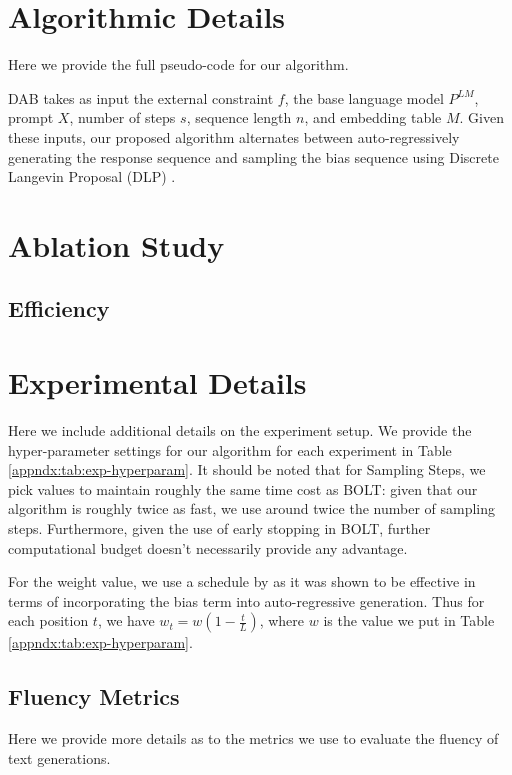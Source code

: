 \section{Algorithmic Details} \label{appndx:algrthm-details}
Here we provide the full pseudo-code for our algorithm. 


DAB takes as input the external constraint $f$, the base language model $P^{LM}$, prompt $X$, number of steps $s$, sequence length $n$, and embedding table $M$. Given these inputs, our proposed algorithm alternates between auto-regressively generating the response sequence and sampling the bias sequence using Discrete Langevin Proposal (DLP) \citep{zhang2022langevinlike}. 

\section{Ablation Study}
\label{appndx:ablation}


\subsection{Efficiency}
\label{appndx:efficiency}


\section{Experimental Details}
Here we include additional details on the experiment setup. We provide the hyper-parameter settings for our algorithm  for each experiment in Table \ref{appndx:tab:exp-hyperparam}. It should be noted that for Sampling Steps, we pick values to maintain roughly the same time cost as BOLT: given that our algorithm is roughly twice as fast, we use around twice the number of sampling steps. Furthermore, given the use of early stopping in BOLT, further computational budget doesn't necessarily provide any advantage. 

For the weight value, we use a schedule by \citet{liu2023bolt} as it was shown to be effective in terms of incorporating the bias term into auto-regressive generation. Thus for each position $t$, we have $w_t = w(1 - \frac{t}{L})$, where $w$ is the value we put in Table \ref{appndx:tab:exp-hyperparam}. 


\subsection{Fluency Metrics}
\label{appndx:fluency-metrics}
Here we provide more details as to the metrics we use to evaluate the fluency of text generations. 
